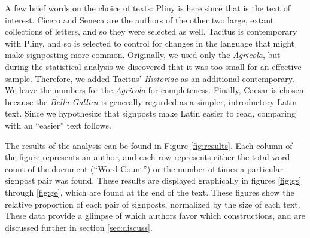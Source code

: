 A few brief words on the choice of texts: Pliny is here since that is the text of interest. Cicero and Seneca are the authors of the other two large, extant collections of letters, and so they were selected as well. Tacitus is contemporary with Pliny, and so is selected to control for changes in the language that might make signposting more common. Originally, we used only the \textit{Agricola}, but during the statistical analysis we discovered that it was too small for an effective sample. Therefore, we added Tacitus' \textit{Historiae} as an additional contemporary. We leave the numbers for the \textit{Agricola} for completeness. Finally, Caesar is chosen because the \textit{Bella Gallica} is generally regarded as a simpler, introductory Latin text. Since we hypothesize that signposts make Latin easier to read, comparing with an ``easier'' text follows.

The results of the analysis can be found in Figure \ref{fig:results}. Each column of the figure represents an author, and each row represents either the total word count of the document (``Word Count'') or the number of times a particular signpost pair was found. These results are displayed graphically in figures \ref{fig:gs} through \ref{fig:ge}, which are found at the end of the text. These figures show the relative proportion of each pair of signposts, normalized by the size of each text. These data provide a glimpse of which authors favor which constructions, and are discussed further in section \ref{sec:discuss}.

